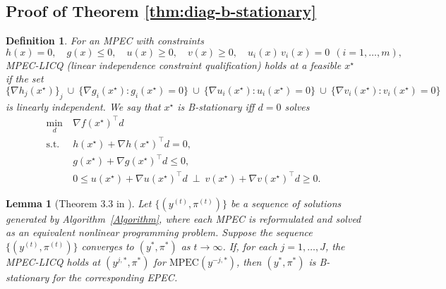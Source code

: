 \documentclass{article}
\newtheorem{lemma}{Lemma}
\newtheorem{definition}{Definition}
\begin{document}
\subsection{Proof of Theorem \ref{thm:diag-b-stationary}}
\label{proof:stationary}

\begin{definition}
For an MPEC with constraints
\[
h(x)=0,\quad g(x)\le 0,\quad u(x)\ge 0,\quad v(x)\ge 0,\quad u_i(x)\,v_i(x)=0\ \ (i=1,\dots,m),
\]
MPEC-LICQ (linear independence constraint qualification) holds at a feasible $x^\star$ if the set
\[
\big\{\nabla h_j(x^\star)\big\}_j\ \cup\
\big\{\nabla g_i(x^\star): g_i(x^\star)=0\big\}\ \cup\
\big\{\nabla u_i(x^\star): u_i(x^\star)=0\big\}\ \cup\
\big\{\nabla v_i(x^\star): v_i(x^\star)=0\big\}
\]
is linearly independent.
We say that $x^\star$ is B-stationary iff $d=0$ solves 
\[
\begin{aligned}
\min_{d}\ & \nabla f(x^\star)^{\!\top} d\\
\text{s.t. }& h(x^\star)+\nabla h(x^\star)^{\!\top} d=0,\\
& g(x^\star)+\nabla g(x^\star)^{\!\top} d\le 0,\\
& 0\le u(x^\star)+\nabla u(x^\star)^{\!\top} d\ \perp\ 
v(x^\star)+\nabla v(x^\star)^{\!\top} d\ge 0 .
\end{aligned}
\]
\end{definition}

\begin{lemma}[Theorem 3.3 in \citep{su2005equilibrium}]
\label{lemma:stationary}
Let $\{(y^{(t)},\pi^{(t)})\}$ be a sequence of solutions generated by Algorithm~\ref{Algorithm}, where
each MPEC is reformulated and solved as an equivalent nonlinear programming problem. Suppose the
sequence $\{(y^{(t)},\pi^{(t)})\}$ converges to $(y^*,\pi^*)$ as $t\to\infty$.
If, for each $j=1,\ldots,J$, the MPEC-LICQ holds at $(y^{j,*},\pi^*)$ for
$\mathrm{MPEC}(y^{-j,*})$, then $(y^*,\pi^*)$ is B-stationary for the
corresponding EPEC.
\end{lemma}
\end{document}

